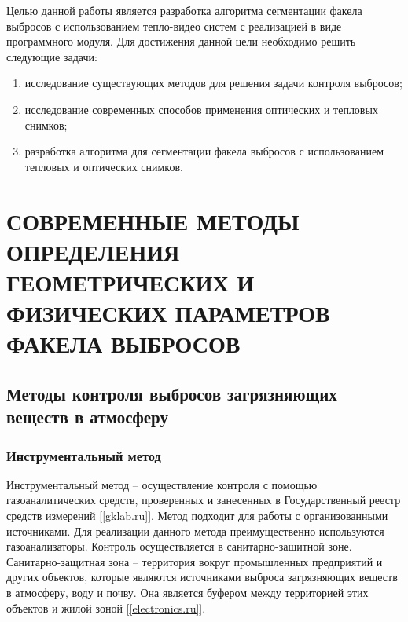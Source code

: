 \documentclass[14pt, a4paper]{extreport}
\begin{document}
	Целью данной работы является разработка алгоритма сегментации факела выбросов с использованием тепло-видео систем с реализацией в виде программного модуля. Для достижения данной цели необходимо решить следующие задачи:
	\begin{enumerate}[label={\arabic*)}]
		\item исследование существующих методов для решения задачи контроля выбросов;
		\item исследование современных способов применения оптических и тепловых снимков;
		\item разработка алгоритма для сегментации факела выбросов с использованием тепловых и оптических снимков.
	\end{enumerate}
	
	\chapter [\vspace*{-0.22cm}СОВРЕМЕННЫЕ МЕТОДЫ ОПРЕДЕЛЕНИЯ ГЕОМЕТРИЧЕСКИХ \hspace*{-0.5cm} И ФИЗИЧЕСКИХ ПАРАМЕТРОВ ФАКЕЛА ВЫБРОСОВ]{\vspace*{-0.22cm}СОВРЕМЕННЫЕ МЕТОДЫ ОПРЕДЕЛЕНИЯ ГЕОМЕТРИЧЕСКИХ И ФИЗИЧЕСКИХ ПАРАМЕТРОВ ФАКЕЛА ВЫБРОСОВ}
	\section {Методы контроля выбросов загрязняющих веществ в атмосферу}
	\subsection {Инструментальный метод}
	Инструментальный метод -- осуществление контроля с помощью газоаналитических средств, проверенных и занесенных в Государственный реестр средств измерений [\ref{gklab.ru}]. Метод подходит для работы с организованными источниками. Для реализации данного метода преимущественно используются газоанализаторы. Контроль осуществляется в санитарно-защитной зоне. Санитарно-защитная зона -- территория вокруг промышленных предприятий и других объектов, которые являются источниками выброса загрязняющих веществ в атмосферу, воду и почву. Она является буфером между территорией этих объектов и жилой зоной [\ref{electronics.ru}].
	
\end{document}
